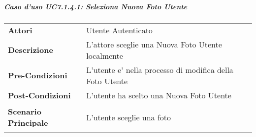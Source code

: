 \subparagraph{Caso d'uso UC7.1.4.1:  Seleziona Nuova Foto Utente}
\label{UC7_1_4_1}

\begin{tabular}{ l | p{11cm}}
	\hline
	\rowcolor{Gray}
	 \multicolumn{2}{c}{UC7.1.4.1:  Seleziona Nuova Foto Utente} \\
	 \hline
	\textbf{Attori} & Utente Autenticato \\
	\textbf{Descrizione} & L'attore sceglie una Nuova Foto Utente localmente\\
	\textbf{Pre-Condizioni} & L'utente e' nella processo di modifica della Foto Utente\\
	\textbf{Post-Condizioni} & L'utente ha scelto una Nuova Foto Utente\\
	\textbf{Scenario Principale} & 
	\begin{enumerate*}[label=(\arabic*.),itemjoin={\newline}]
		\item L'utente sceglie una foto 
	\end{enumerate*}\\
\end{tabular}